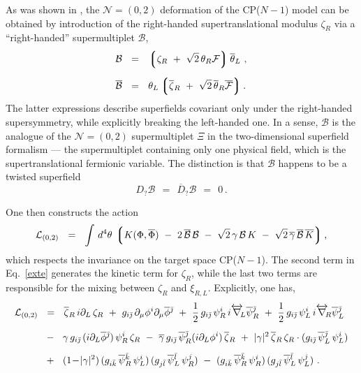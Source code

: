 \documentclass[12pt]{article}
\def\beq{\begin{equation}}
\def\eeq{\end{equation}}
\newcommand{\ntwoo}{${\mathcal N}= \left(0,2\right) $ }
\newcommand{\p}{\partial}
\newcommand{\ov}{\overline}
\newcommand{\mc}[1]{\mathcal{#1}}
\newcommand{\lgr}{\left\lgroup}
\newcommand{\rgr}{\right\rgroup}
\newcommand{\bzr}{\ov{\zeta}{}_R}
\newcommand{\zr}{\zeta_R}
\newcommand{\bj}{{\bar \jmath}}
\newcommand{\bk}{{\bar k}}
\newcommand{\bl}{{\bar l}}
\begin{document}
	As was shown in \cite{SYhet},  the \ntwoo deformation of the CP($N-1$) model can be obtained by
	introduction of the right-handed supertranslational modulus $ \zeta_R $ via a ``right-handed'' 
	supermultiplet $ \mc{B} $,
\begin{align*}
%
	\mc{B} & ~~=~~ \lgr \zr ~+~ \sqrt{2}\,\theta_R\mc{F} \rgr \ov{\theta}{}_L~, \\[2mm]
%
	\ov{\mc{B}} & ~~=~~ \theta_L \lgr \bzr ~+~ \sqrt{2}\, \ov{\theta}{}_R \ov{\mc{F}} \rgr.
\end{align*}
	The latter expressions describe superfields covariant only under the right-handed supersymmetry, 
	while explicitly breaking the left-handed one.
	In a sense, $ \mc{B} $ is the analogue of the \ntwoo supermultiplet $\Xi$ in the two-dimensional 
	superfield formalism \cite{Edalati} ---
	the supermultiplet containing only one physical field, which is the supertranslational
	fermionic variable.
	The distinction is that $ \mc{B} $ happens to be a twisted superfield
\[
	D_? \mc{B} ~~=~~ \ov{D}_? \mc{B} ~~=~~ 0\,.
\]
	
	One then constructs the action 
\beq
\label{exte}
	\mc{L}_{(0,2)} ~~=~~ \int\, d^4\theta\, \lgr K(\Phi,\ov{\Phi}) 
		~-~ 2\, \ov{\mc{B}}\,\mc{B}  
		~-~  \sqrt{2}\, \gamma\,\mc{B}\,K  ~-~ \sqrt{2}\, \ov{\gamma}\,\ov{\mc{B}}\,\ov{K} \rgr,
\eeq
	which respects the invariance on the target space CP($N-1$).
	The second term in Eq.~\eqref{exte} generates the kinetic term for $ \zr $, while the last two terms 
	are responsible for the mixing between $ \zr $ and $ \xi_{R,L} $.
	Explicitly, one has,
\begin{align}
%
\notag
	\mc{L}_{(0,2)} & ~~=~~  \bzr\, i\p_L\, \zr 
			~+~ g_{i\bj}\,\p_\mu \phi^i \p_\mu\ov{\phi}{}^\bj
			~+~ \frac{1}{2}\, g_{i\bj}\, \psi^i_R\, i\overleftrightarrow{\nabla}{}_{\!\!L} \ov{\psi}{}^\bj_R 
			~+~ \frac{1}{2}\, g_{i\bj}\, \psi^i_L\, i\overleftrightarrow{\nabla}{}_{\!\!R} \ov{\psi}{}^\bj_L 
	\\[2mm]
%
\label{cpn-1g}
			& 
			~~-~~ \gamma\, g_{i\bj}\, (i \p_L \ov{\phi}{}^\bj)\, \psi_R^i\, \zr
			~-~ \ov{\gamma}\, g_{i\bj}\, \ov{\psi}{}_R^\bj (i \p_L \phi^i)\, \bzr
			~+~ |\gamma|^2\, \bzr\,\zr \cdot ( g_{i\bj}\, \ov{\psi}{}_L^\bj\, \psi_L^i )
	\\[2mm]
%
\notag
			& 
			~~+~~ (1 \!-\! |\gamma|^2)\, (g_{i\bk}\, \ov{\psi}{}_R^\bk\, \psi_L^i)\,
						     (g_{j\bl}\, \ov{\psi}{}_L^\bl\, \psi_R^j)
			~-~ (g_{i\bk}\, \ov{\psi}{}_R^\bk\, \psi_R^i)\, (g_{j\bl}\, \ov{\psi}{}_L^\bl\, \psi_L^j)~.
\end{align}
	
\end{document}
